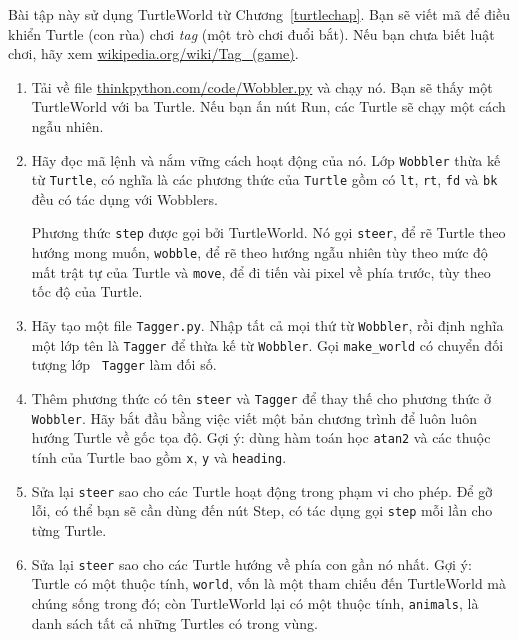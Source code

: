 \documentclass[11pt]{book}
\begin{document}
\begin{ex}


Bài tập này sử dụng TurtleWorld từ Chương~\ref{turtlechap}.
Bạn sẽ viết mã để điều khiển Turtle (con rùa) chơi {\em tag} (một trò chơi
đuổi bắt). Nếu bạn chưa biết luật chơi, hãy xem 
\url{wikipedia.org/wiki/Tag_(game)}.

\begin{enumerate}

\item Tải về file \url{thinkpython.com/code/Wobbler.py} và chạy nó. Bạn sẽ
thấy một TurtleWorld với ba Turtle. Nếu bạn ấn nút
{\sf Run}, các Turtle sẽ chạy một cách ngẫu nhiên.

\item Hãy đọc mã lệnh và nắm vững cách hoạt động của nó.
Lớp {\tt Wobbler} thừa kế từ {\tt Turtle}, có nghĩa là các
phương thức của {\tt Turtle} gồm có {\tt lt}, {\tt rt}, {\tt fd}
và {\tt bk} đều có tác dụng với Wobblers.

Phương thức {\tt step} được gọi bởi TurtleWorld.  Nó gọi 
{\tt steer}, để rẽ Turtle theo hướng mong muốn,
{\tt wobble}, để rẽ theo hướng ngẫu nhiên tùy theo  mức độ mất trật tự của Turtle
và {\tt move}, để đi tiến vài pixel về phía trước,
tùy theo tốc độ của Turtle.


\item Hãy tạo một file {\tt Tagger.py}. Nhập tất cả mọi thứ từ 
  {\tt Wobbler}, rồi định nghĩa một lớp tên là {\tt Tagger} để thừa kế
  từ {\tt Wobbler}.  Gọi \verb"make_world" có chuyển đối tượng lớp {\tt
    Tagger} làm đối số.

\item Thêm phương thức có tên {\tt steer} và {\tt Tagger} để thay thế cho phương thức ở
  {\tt Wobbler}.  Hãy bắt đầu bằng việc viết một bản chương trình để luôn luôn 
  hướng Turtle về gốc tọa độ. Gợi ý: dùng hàm toán học 
  {\tt atan2} và các thuộc tính của Turtle bao gồm {\tt x}, {\tt y} và
  {\tt heading}.

\item Sửa lại {\tt steer} sao cho các Turtle hoạt động trong phạm vi cho phép.
  Để gỡ lỗi, có thể bạn sẽ cần dùng đến nút {\sf Step},
  có tác dụng gọi {\tt step} mỗi lần cho từng Turtle.

\item Sửa lại {\tt steer} sao cho các Turtle hướng về phía con gần nó nhất.
  Gợi ý: Turtle có một thuộc tính, {\tt world}, vốn là một tham chiếu đến
  TurtleWorld mà chúng sống trong đó; còn TurtleWorld lại có một
  thuộc tính, {\tt animals}, là danh sách tất cả những Turtles có trong
  vùng.


\end{enumerate}
\end{ex}
\end{document}

